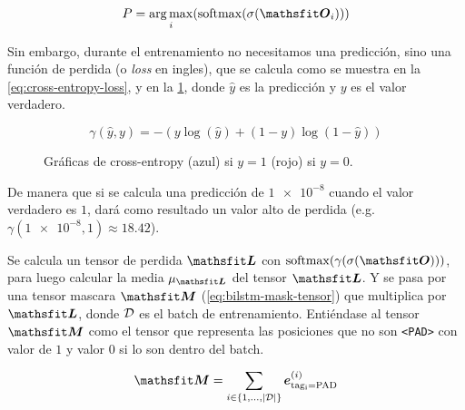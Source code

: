 \begin{equation} \label{eq:bilstm-pred}
  P = \argmax_i (\softmax(\sigmoid(\tO_i)))
\end{equation}

Sin embargo, durante el entrenamiento no necesitamos una predicción, sino una función de perdida (o \emph{loss} en ingles), que se calcula como se muestra en la \cref{eq:cross-entropy-loss}, y en la \cref{fig:cross-entropy-y1}, donde $\hat{y}$ es la predicción y $y$ es el valor verdadero.

\begin{equation} \label{eq:cross-entropy-loss}
  \gamma(\hat{y}, y) = -{(y\log(\hat{y}) + (1 - y)\log(1 - \hat{y}))}
\end{equation}

\begin{figure}[H]
  \centering
\decoRule
\caption[Gráficas de cross-entropy]{Gráficas de cross-entropy (azul) si $y = 1$ (rojo) si $y = 0$.}
\label{fig:cross-entropy-y1}
\end{figure}

De manera que si se calcula una predicción de $\num{1e-8}$ cuando el valor verdadero es $1$, dará como resultado un valor alto de perdida (e.g. $\gamma(\num{1e-8}, 1) \approx \num{18.42}$).

Se calcula un tensor de perdida $\tL$ con $\softmax(\gamma(\sigmoid(\tO)))$, para luego calcular la media $\mu_{\tL}$ del tensor $\tL$. Y se pasa por una tensor mascara $\tM$ (\cref{eq:bilstm-mask-tensor}) que multiplica por $\tL$, donde $\mathcal{D}$ es el batch de entrenamiento. Entiéndase al tensor $\tM$ como el tensor que representa las posiciones que no son \texttt{<PAD>} con valor de $1$ y valor $0$ si lo son dentro del batch.

\begin{equation} \label{eq:bilstm-mask-tensor}
  \tM = \sum_{i \in \{1, \ldots, |\train|\}} \ve_{\mathrm{tag_i = \mathrm{PAD}}}^{(i)}
\end{equation}

